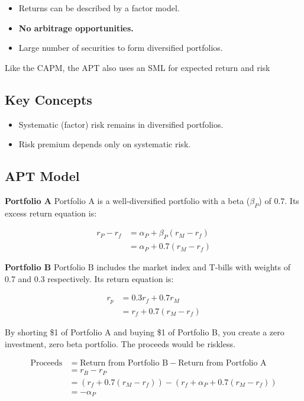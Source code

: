 \documentclass[
]{book}
\providecommand{\tightlist}{%
  \setlength{\itemsep}{0pt}\setlength{\parskip}{0pt}}
\begin{document}
\begin{itemize}
\tightlist
\item
  Returns can be described by a factor model.
\item
  \textbf{No arbitrage opportunities.}
\item
  Large number of securities to form diversified portfolios.
\end{itemize}

Like the CAPM, the APT also uses an SML for expected return and risk

\hypertarget{key-concepts}{%
\subsection{Key Concepts}\label{key-concepts}}

\begin{itemize}
\tightlist
\item
  Systematic (factor) risk remains in diversified portfolios.
\item
  Risk premium depends only on systematic risk.
\end{itemize}

\hypertarget{apt-model}{%
\subsection{APT Model}\label{apt-model}}

\textbf{Portfolio A} Portfolio A is a well-diversified portfolio with a
beta (\(\beta_P\)) of 0.7. Its excess return equation is:

\[
\begin{align}
r_P - r_f &= \alpha_P + \beta_P (r_M - r_f) \\
          &= \alpha_P + 0.7(r_M - r_f)
\end{align}
\]

\textbf{Portfolio B} Portfolio B includes the market index and T-bills
with weights of 0.7 and 0.3 respectively. Its return equation is:

\[
\begin{align}
r_p &= 0.3r_f + 0.7r_M \\
    &= r_f + 0.7(r_M - r_f)
\end{align}
\]

By shorting \$1 of Portfolio A and buying \$1 of Portfolio B, you create
a zero investment, zero beta portfolio. The proceeds would be riskless.

\[
\begin{align}
\text{Proceeds} &= \text{Return from Portfolio B} - \text{Return from Portfolio A} \\
                &= r_B - r_P \\
                &= \left( r_f + 0.7(r_M - r_f) \right) - \left( r_f + \alpha_P + 0.7(r_M - r_f) \right) \\
                &= -\alpha_P
\end{align}
\]
\end{document}
